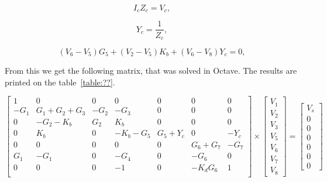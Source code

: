 \begin{equation}
  I_{c}Z_{c} = V_{c},
  \label{eq:caphasor1}
\end{equation}

\begin{equation}
 Y_c = \frac{1}{Z_c},
  \label{eq:caphasor2}
\end{equation}

\begin{equation}
   (V_{6} - V_{5})G_{5} + (V_{2} - V_{5})K_{b} + (V_{6} - V_{8})Y_{c} = 0,
  \label{eq:node67}
\end{equation}

From this we get the following matrix, that was solved in Octave. The results are printed on the table~\ref{table:??}.

\begin{equation}
\left[ \begin{array}{ccccccc} 
		1 & 0 & 0 & 0 & 0 & 0 & 0 \\ 
		-G_1 & G_1+G_2+G_3 & -G_2 & -G_3 & 0 & 0 & 0 \\
		0 & -G_2-K_b & G_2 & K_b & 0 & 0 & 0 \\ 
		0 & K_b & 0 & -K_b-G_5 & G_5+Y_c & 0 & -Y_c  \\ 
		0 & 0 & 0 & 0 & 0 & G_6+G_7 & -G_7  \\ 
		G_1 & -G_1 & 0 & -G_4 & 0 & -G_6 & 0  \\ 
		0 & 0 & 0 & -1 & 0 & -K_dG_6 & 1 \\ 

\end{array} \right]
\times \left[ \begin{array}{c} V_1 \\ V_2 \\ V_3 \\  V_5 \\ V_6 \\ V_7 \\ V_8 \end{array} \right] =
\left[ \begin{array}{c} V_s \\ 0 \\ 0 \\ 0 \\ 0 \\ 0 \\ 0  \end{array} \right]
\label{eq:nodalmatrix4}
\end{equation}

\newpage

